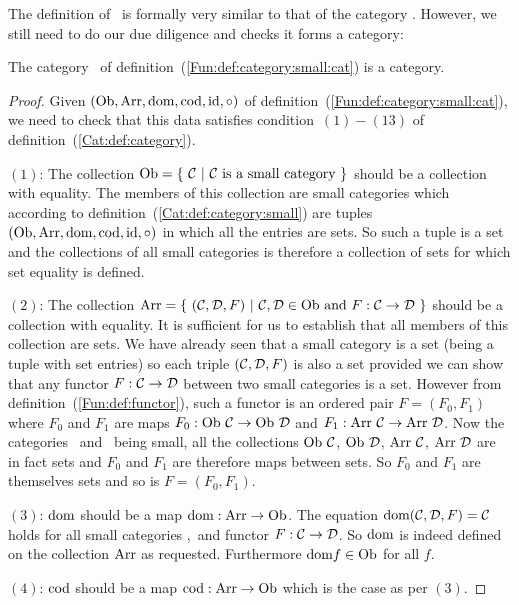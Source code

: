 The definition of \cat\ is formally very similar to that of the category \Set.
However, we still need to do our due diligence and checks it forms a category:

\begin{prop}\label{Fun:prop:category:small:cat}
    The category \cat\ of definition~(\ref{Fun:def:category:small:cat}) is 
    a category.
\end{prop}
\begin{proof}
    Given $(\mbox{\rm Ob}, \mbox{\rm Arr}, \mbox{\rm dom}, \mbox{\rm cod}, \mbox{\rm id}, \circ)$ of
    definition~(\ref{Fun:def:category:small:cat}), we need to check that this
    data satisfies condition~$(1)-(13)$ of definition~(\ref{Cat:def:category}).

    $(1)$: The collection $\ob=\{\ \Cat\ |\ \mbox{\Cat\ is a small category}\ \}$
    should be a collection with equality. The members of this collection are 
    small categories which according to definition~(\ref{Cat:def:category:small})
    are tuples $(\mbox{\rm Ob}, \mbox{\rm Arr}, \mbox{\rm dom}, \mbox{\rm cod}, \mbox{\rm id}, \circ)$ in which all the entries
    are sets. So such a tuple is a set and the collections of all small 
    categories is therefore a collection of sets for which set equality is 
    defined.

    $(2)$: The collection $\arr =\{\ (\Cat,\Dat,F)\ |\ \Cat,\Dat\in\ob\  
    \mbox{and}\ F:\Cat\to\Dat\ \}$ should be a collection with equality.
    It is sufficient for us to establish that all members of this collection
    are sets. We have already seen that a small category is a set
    (being a tuple with set entries) so each triple $(\mbox{$\cal C$},\mbox{$\cal D$},F)$ is also
    a set provided we can show that any functor $F:\mbox{$\cal C$}\to\mbox{$\cal D$}$ between two
    small categories is a set. However from definition~(\ref{Fun:def:functor}),
    such a functor is an ordered pair $F=(F_{0},F_{1})$ where $F_{0}$ and 
    $F_{1}$ are maps $F_{0}:\mbox{\rm Ob}\ \mbox{$\cal C$}\to\mbox{\rm Ob}\ \mbox{$\cal D$}$ and 
    $F_{1}:\mbox{\rm Arr}\ \mbox{$\cal C$}\to\mbox{\rm Arr}\ \mbox{$\cal D$}$. Now the categories \Cat\ and \Dat\ being
    small, all the collections $\mbox{\rm Ob}\ \mbox{$\cal C$}$, $\ob\ \Dat$, $\mbox{\rm Arr}\ \mbox{$\cal C$}$, 
    $\mbox{\rm Arr}\ \mbox{$\cal D$}$ are in fact sets and $F_{0}$ and $F_{1}$ are therefore maps
    between sets. So $F_{0}$ and $F_{1}$ are themselves sets and so is 
    $F=(F_{0},F_{1})$.

    $(3)$: $\mbox{\rm dom}$ should be a map $\mbox{\rm dom}:\mbox{\rm Arr}\to\mbox{\rm Ob}$. The equation
    $\mbox{\rm dom}(\mbox{$\cal C$},\mbox{$\cal D$},F)=\mbox{$\cal C$}$ holds for all small categories \Cat,\Dat\ and 
    functor $F:\mbox{$\cal C$}\to\mbox{$\cal D$}$. So $\mbox{\rm dom}$ is indeed defined on the collection
    $\mbox{\rm Arr}$ as requested. Furthermore $\mbox{\rm dom} f \in\mbox{\rm Ob}$ for all $f$.

    $(4)$: $\mbox{\rm cod}$ should be a map $\mbox{\rm cod}:\mbox{\rm Arr}\to\mbox{\rm Ob}$ which is the case 
    as per $(3)$.


\end{proof}
